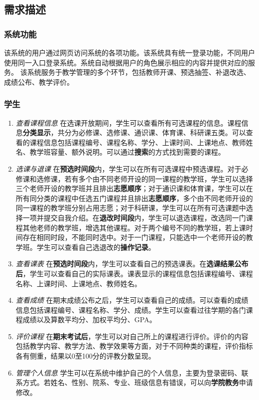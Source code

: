 \subsection{需求描述}

\subsubsection{系统功能}
\ttfamily
该系统的用户通过{\sffamily 网页}访问系统的各项功能。该系统具有{\sffamily 统一登录}功能，不同用户使用同一入口登录系统。系统自动根据用户的角色展示相应的内容并提供对应的服务。
该系统服务于教学管理的多个环节，包括教师开课、预选抽签、补退改选、成绩公布、教学评价。

\normalfont

\subsubsection{学生}
\begin{enumerate}
    \item \textit{查看课程信息} \quad 在选课开放期间，学生可以查看所有可选课程的信息。课程信息\textbf{分类显示}，共分为必修课、选修课、通识课、体育课、科研课五类。可以查看的课程信息包括课程编号、课程名称、学分、上课时间、上课地点、教师姓名、教学班容量、额外说明。可以通过\textbf{搜索}的方式找到需要的课程。
    \item \textit{选课与退课} \quad 在\textbf{预选时间段}内，学生可以在所有可选课程中预选课程。对于必修课和选修课，若有多个由不同老师开设的同一课程的教学班，学生可以选择三个老师开设的教学班并且排出\textbf{志愿顺序}；对于通识课和体育课，学生可以在所有同分类的课程中任选五门课程并且排出\textbf{志愿顺序}，多个由不同老师开设的同一课程的教学班分别占用志愿；对于科研课，学生可以在所有可选课题中选择一项并提交自我介绍。在\textbf{退改时间段}内，学生可以退选课程，改选同一门课程其他老师的教学班，增选其他课程。对于两个编号不同的教学班，若上课时间存在相同时段，不能同时选中。对于一门课程，只能选中一个老师开设的教学班。学生可以查看自己选退改的\textbf{操作记录}。
    \item \textit{查看课表} \quad 在\textbf{预选时间段}内，学生可以查看自己的预选课表。在\textbf{选课结果公布后}，学生可以查看自己的实际课表。课表显示的课程信息包括课程编号、课程名称、上课时间、上课地点、教师姓名。
    \item \textit{查看成绩} \quad 在期末成绩公布之后，学生可以查看自己的成绩。可以查看的成绩信息包括课程编号、课程名称、学分、成绩。学生可以查看过往学期的各门课程成绩以及算数平均分、加权平均分、GPA。
    \item \textit{评价课程} \quad 在\textbf{期末考试后}，学生可以对自己所上的课程进行评价。评价的内容包括教学内容、教学方法、教学效果等方面，对于不同种类的课程，评价指标各有侧重，结果以0至100分的评教分数呈现。
    \item \textit{管理个人信息} \quad 学生可以在系统中维护自己的个人信息，主要为登录密码、联系方式。若姓名、性别、院系、专业、班级信息有错误，可以向\textbf{学院教务}申请修改。
\end{enumerate}

